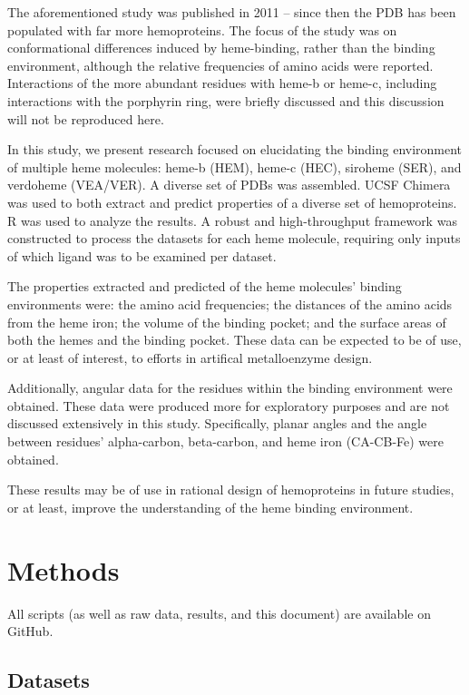 \documentclass[a4paper, nobind]{templates/ociamthesis}
\begin{document}
The aforementioned study was published in 2011 -- since then the PDB has been populated with far more hemoproteins. The focus of the study was on conformational differences induced by heme-binding, rather than the binding environment, although the relative frequencies of amino acids were reported. Interactions of the more abundant residues with heme-b or heme-c, including interactions with the porphyrin ring, were briefly discussed and this discussion will not be reproduced here.

In this study, we present research focused on elucidating the binding environment of multiple heme molecules: heme-b (HEM), heme-c (HEC), siroheme (SER), and verdoheme (VEA/VER). A diverse set of PDBs was assembled. UCSF Chimera was used to both extract and predict properties of a diverse set of hemoproteins. R was used to analyze the results. A robust and high-throughput framework was constructed to process the datasets for each heme molecule, requiring only inputs of which ligand was to be examined per dataset.

The properties extracted and predicted of the heme molecules' binding environments were: the amino acid frequencies; the distances of the amino acids from the heme iron; the volume of the binding pocket; and the surface areas of both the hemes and the binding pocket. These data can be expected to be of use, or at least of interest, to efforts in artifical metalloenzyme design.

Additionally, angular data for the residues within the binding environment were obtained. These data were produced more for exploratory purposes and are not discussed extensively in this study. Specifically, planar angles and the angle between residues' alpha-carbon, beta-carbon, and heme iron (CA-CB-Fe) were obtained.

These results may be of use in rational design of hemoproteins in future studies, or at least, improve the understanding of the heme binding environment.

\adjustmtc
{}

\hypertarget{methods}{%
\chapter{Methods}\label{methods}}

All scripts (as well as raw data, results, and this document) are available on GitHub\autocite{Finnerty_hemebinding_2021}.

\hypertarget{datasets}{%
\section{Datasets}\label{datasets}}
\end{document}
